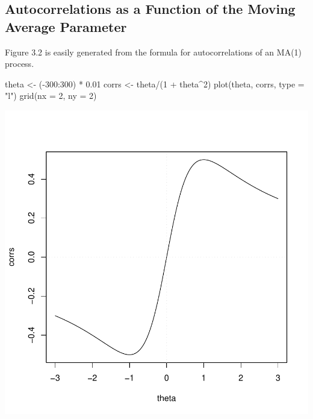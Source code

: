 \documentclass[a4paper]{article}
\begin{document}
\subsection{Autocorrelations as a Function of the Moving Average Parameter}
Figure 3.2 is easily generated from the formula for autocorrelations of an MA(1) process.
\begin{Schunk}
\begin{Sinput}
 theta <- (-300:300) * 0.01
 corrs <- theta/(1 + theta^2)
 plot(theta, corrs, type = "l")
 grid(nx = 2, ny = 2)
\end{Sinput}
\end{Schunk}
\includegraphics{Companion-019}
\end{document}
